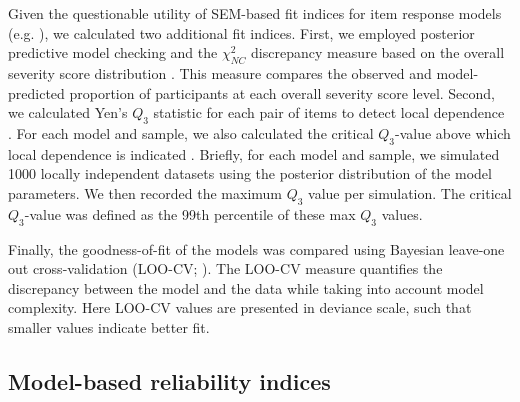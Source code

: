 \documentclass[letterpaper,man,natbib]{apa6}  %
\begin{document}
Given the questionable utility of SEM-based fit indices for item response models (e.g. \citealt{reise2014evaluating}), we calculated two additional fit indices. First, we employed posterior predictive model checking and the $\chi^2_{NC}$ discrepancy measure based on the overall severity score distribution \citep{sinharay2006posterior}. This measure compares the observed and model-predicted proportion of participants at each overall severity score level. Second, we calculated Yen's $Q_3$ statistic for each pair of items to detect local dependence \citep{yen1984effects}. For each model and sample, we also calculated the critical $Q_3$-value above which local dependence is indicated  \citep{christensen2017critical}. Briefly, for each model and sample, we simulated 1000 locally independent datasets using the posterior distribution of the model parameters. We then recorded the maximum $Q_3$ value per simulation. The critical $Q_3$-value was defined as the 99th percentile of these max $Q_3$ values. 

Finally, the goodness-of-fit of the models was compared using Bayesian leave-one out cross-validation (LOO-CV; \citealt{vehtari2017practical}). The LOO-CV measure quantifies the discrepancy between the model and the data while taking into account model complexity. Here LOO-CV values are presented in deviance scale, such that smaller values indicate better fit.

\subsection{Model-based reliability indices}
\end{document}
